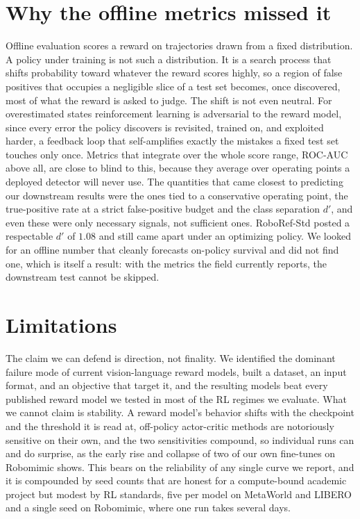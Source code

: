 \section{Why the offline metrics missed it}

Offline evaluation scores a reward on trajectories drawn from a fixed distribution. A policy under training is not such a distribution. It is a search process that shifts probability toward whatever the reward scores highly, so a region of false positives that occupies a negligible slice of a test set becomes, once discovered, most of what the reward is asked to judge. The shift is not even neutral. For overestimated states reinforcement learning is adversarial to the reward model, since every error the policy discovers is revisited, trained on, and exploited harder, a feedback loop that self-amplifies exactly the mistakes a fixed test set touches only once. Metrics that integrate over the whole score range, ROC-AUC above all, are close to blind to this, because they average over operating points a deployed detector will never use. The quantities that came closest to predicting our downstream results were the ones tied to a conservative operating point, the true-positive rate at a strict false-positive budget and the class separation $d'$, and even these were only necessary signals, not sufficient ones. RoboRef-Std posted a respectable $d'$ of $1.08$ and still came apart under an optimizing policy. We looked for an offline number that cleanly forecasts on-policy survival and did not find one, which is itself a result: with the metrics the field currently reports, the downstream test cannot be skipped.

\section{Limitations}

The claim we can defend is direction, not finality. We identified the dominant failure mode of current vision-language reward models, built a dataset, an input format, and an objective that target it, and the resulting models beat every published reward model we tested in most of the RL regimes we evaluate. What we cannot claim is stability. A reward model's behavior shifts with the checkpoint and the threshold it is read at, off-policy actor-critic methods are notoriously sensitive on their own, and the two sensitivities compound, so individual runs can and do surprise, as the early rise and collapse of two of our own fine-tunes on Robomimic shows. This bears on the reliability of any single curve we report, and it is compounded by seed counts that are honest for a compute-bound academic project but modest by RL standards, five per model on MetaWorld and LIBERO and a single seed on Robomimic, where one run takes several days.

